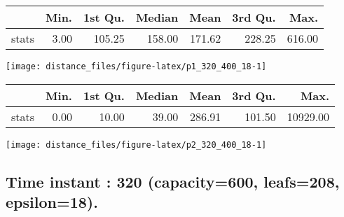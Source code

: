\documentclass[
  9pt,
  landscape]{article}
\begin{document}
\begin{minipage}{0.5\textwidth} 
\centering 
\begin{tabular}{rrrrrrr}
  \hline
 & Min. & 1st Qu. & Median & Mean & 3rd Qu. & Max. \\ 
  \hline
stats & 3.00 & 105.25 & 158.00 & 171.62 & 228.25 & 616.00 \\ 
   \hline
\end{tabular}
\vspace{0.5cm} 


\texttt{[image: distance\_files/figure-latex/p1\_320\_400\_18-1]} 

\end{minipage} 
\begin{minipage}{0.5\textwidth} 
\centering 
\begin{tabular}{rrrrrrr}
  \hline
 & Min. & 1st Qu. & Median & Mean & 3rd Qu. & Max. \\ 
  \hline
stats & 0.00 & 10.00 & 39.00 & 286.91 & 101.50 & 10929.00 \\ 
   \hline
\end{tabular}
\vspace{0.5cm} 


\texttt{[image: distance\_files/figure-latex/p2\_320\_400\_18-1]} 

\end{minipage}

\pagebreak

\hypertarget{time-instant-320-capacity600-leafs208-epsilon18.}{%
\subsection{Time instant : 320 (capacity=600, leafs=208,
epsilon=18).}\label{time-instant-320-capacity600-leafs208-epsilon18.}}
\end{document}
